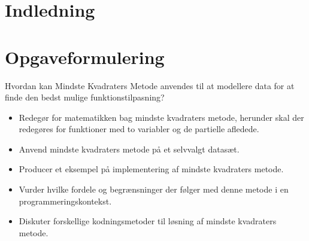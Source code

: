 \section{Indledning}\label{sec:indledning}

\section{Opgaveformulering}\label{sec:opgaveformulering}
Hvordan kan Mindste Kvadraters Metode anvendes til at modellere data for at finde den bedst mulige funktionstilpasning?
\begin{itemize}
    \item Redegør for matematikken bag mindste kvadraters metode, herunder skal der redegøres for funktioner med to variabler og de partielle afledede.
    \item Anvend mindste kvadraters metode på et selvvalgt datasæt.
    \item Producer et eksempel på implementering af mindste kvadraters metode.
    \item Vurder hvilke fordele og begrænsninger der følger med denne metode i en programmeringskontekst.
    \item Diskuter forskellige kodningsmetoder til løsning af mindste kvadraters metode. 
\end{itemize}
\newpage